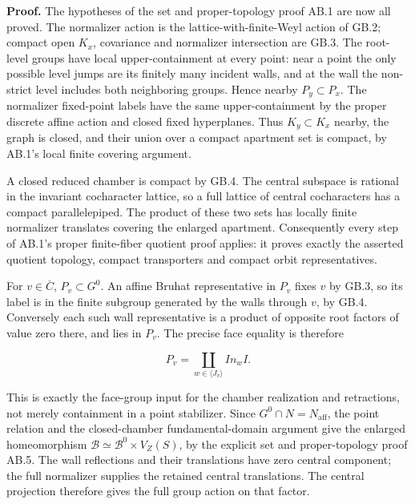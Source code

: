 \documentclass[
  11pt,
]{article}
\begin{document}
\textbf{Proof.} The hypotheses of the set and proper-topology proof AB.1
are now all proved. The normalizer action is the
lattice-with-finite-Weyl action of GB.2; compact open \(K_x\),
covariance and normalizer intersection are GB.3. The root-level groups
have local upper-containment at every point: near a point the only
possible level jumps are its finitely many incident walls, and at the
wall the non-strict level includes both neighboring groups. Hence nearby
\(P_y\subset P_x\). The normalizer fixed-point labels have the same
upper-containment by the proper discrete affine action and closed fixed
hyperplanes. Thus \(K_y\subset K_x\) nearby, the graph is closed, and
their union over a compact apartment set is compact, by AB.1's local
finite covering argument.

A closed reduced chamber is compact by GB.4. The central subspace is
rational in the invariant cocharacter lattice, so a full lattice of
central cocharacters has a compact parallelepiped. The product of these
two sets has locally finite normalizer translates covering the enlarged
apartment. Consequently every step of AB.1's proper finite-fiber
quotient proof applies: it proves exactly the asserted quotient
topology, compact transporters and compact orbit representatives.

For \(v\in\overline C\), \(P_v\subset G^0\). An affine Bruhat
representative in \(P_v\) fixes \(v\) by GB.3, so its label is in the
finite subgroup generated by the walls through \(v\), by GB.4.
Conversely each such wall representative is a product of opposite root
factors of value zero there, and lies in \(P_v\). The precise face
equality is therefore

\[
 P_v=\coprod_{w\in\langle J_v\rangle}I n_wI.
 \tag{GB.22}
\]

This is exactly the face-group input for the chamber realization and
retractions, not merely containment in a point stabilizer. Since
\(G^0\cap N=N_{\mathrm{aff}}\), the point relation and the
closed-chamber fundamental-domain argument give the enlarged
homeomorphism \(\mathcal B\simeq\mathcal B^0\times V_Z(S)\), by the
explicit set and proper-topology proof AB.5. The wall reflections and
their translations have zero central component; the full normalizer
supplies the retained central translations. The central projection
therefore gives the full group action on that factor.
\end{document}
